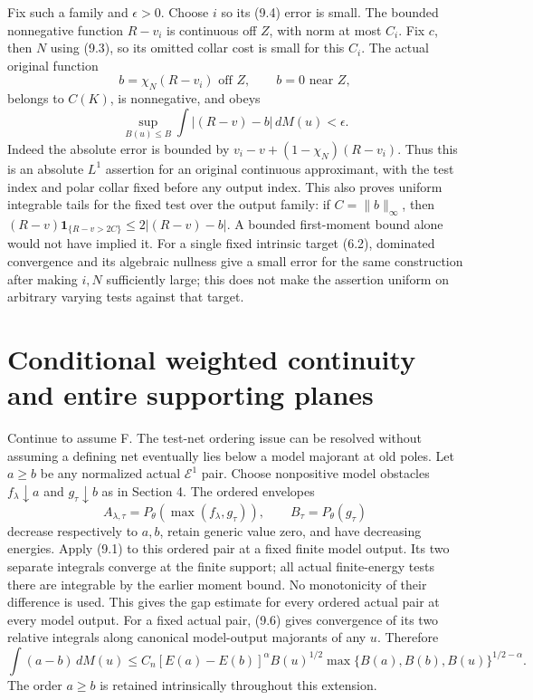 \documentclass[10pt]{article}
\newcommand{\E}{\mathcal E}
\begin{document}
Fix such a family and $\epsilon>0$. Choose $i$ so its (9.4) error is
small. The bounded nonnegative function $R-v_i$ is continuous off $Z$,
with norm at most $C_i$. Fix $c$, then $N$ using (9.3), so its omitted
collar cost is small for this $C_i$. The actual original function
\[
 b=\chi_N(R-v_i)\text{ off }Z,\qquad b=0\text{ near }Z,
\tag{9.5}
\]
belongs to $C(K)$, is nonnegative, and obeys
\[
 \sup_{B(u)\leq B}\int|(R-v)-b|\,dM(u)<\epsilon.
\tag{9.6}
\]
Indeed the absolute error is bounded by
$v_i-v+(1-\chi_N)(R-v_i)$. Thus this is an absolute $L^1$ assertion
for an original continuous approximant, with the test index and polar
collar fixed before any output index. This also proves uniform integrable
tails for the fixed test over the output family: if $C=\|b\|_\infty$,
then $(R-v)\mathbf1_{\{R-v>2C\}}\leq2|(R-v)-b|$.
A bounded first-moment bound alone would not have implied it.
For a single fixed intrinsic target
(6.2), dominated convergence and its algebraic nullness give a small
error for the same construction after making $i,N$ sufficiently large;
this does not make the assertion uniform on arbitrary varying tests
against that target.

\section{Conditional weighted continuity and entire supporting planes}
Continue to assume F. The test-net ordering issue can be resolved without
assuming a defining net eventually lies below a model majorant at old
poles. Let $a\geq b$ be any normalized actual $\E^1$ pair. Choose
nonpositive model obstacles $f_\lambda\downarrow a$ and
$g_\tau\downarrow b$ as in Section 4. The ordered envelopes
\[
 A_{\lambda,\tau}=P_\theta(\max(f_\lambda,g_\tau)),\qquad
 B_\tau=P_\theta(g_\tau)
\]
decrease respectively to $a,b$, retain generic value zero, and have
decreasing energies. Apply (9.1) to this ordered pair at a fixed finite
model output. Its two separate integrals converge at the finite support;
all actual finite-energy tests there are integrable by the earlier
moment bound. No monotonicity of their difference is used. This gives
the gap estimate for every ordered actual pair at every model output.
For a fixed actual pair, (9.6) gives convergence of its two relative
integrals along canonical model-output majorants of any $u$. Therefore
\[
 \int(a-b)\,dM(u)\leq
 C_n[E(a)-E(b)]^\alpha B(u)^{1/2}
       \max\{B(a),B(b),B(u)\}^{1/2-\alpha}.
\tag{10.1}
\]
The order $a\geq b$ is retained intrinsically throughout this extension.
\end{document}
